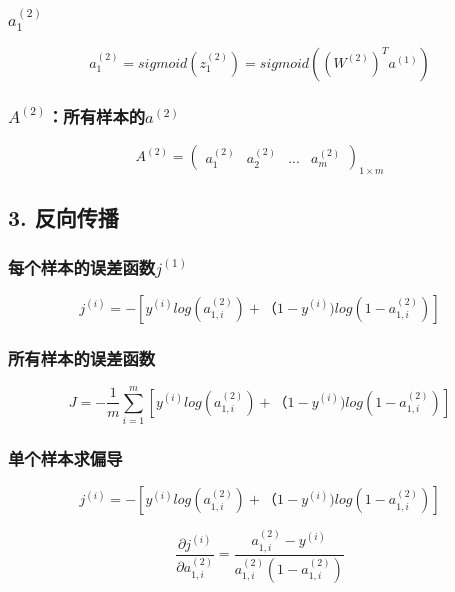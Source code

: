 \documentclass[
]{article}
\begin{document}
\hypertarget{header-n42}{%
\subsubsection{\texorpdfstring{\(a^{(2)}_{1}\)}{a\^{}\{(2)\}\_\{1\}}}\label{header-n42}}

\[a^{(2)}_{1} = sigmoid(z^{(2)}_{1}) = sigmoid((W^{(2)})^{T}a^{(1)})\]

\hypertarget{header-n44}{%
\subsubsection{\texorpdfstring{\(A^{(2)}\)：所有样本的\(a^{(2)}\)}{A\^{}\{(2)\}：所有样本的a\^{}\{(2)\}}}\label{header-n44}}

\[A^{(2)} = {\begin{pmatrix}
  a^{(2)}_{1} & a^{(2)}_{2} & ... & a^{(2)}_{m}
\end{pmatrix}}_{1×m}\]

\hypertarget{header-n46}{%
\subsection{3. 反向传播}\label{header-n46}}

\hypertarget{header-n47}{%
\subsubsection{\texorpdfstring{每个样本的误差函数\(j^{(1)}\)}{每个样本的误差函数j\^{}\{(1)\}}}\label{header-n47}}

\[j^{(i)} = -[y^{(i)}log(a^{(2)}_{1,i})+（1-y^{(i)})log(1-a^{(2)}_{1,i})]\]

\hypertarget{header-n49}{%
\subsubsection{所有样本的误差函数}\label{header-n49}}

\[J = -\frac{1}{m}\sum_{i=1}^{m}[y^{(i)}log(a^{(2)}_{1,i})+（1-y^{(i)})log(1-a^{(2)}_{1,i})]\]

\hypertarget{header-n51}{%
\subsubsection{单个样本求偏导}\label{header-n51}}

\[j^{(i)} = -[y^{(i)}log(a^{(2)}_{1,i})+（1-y^{(i)})log(1-a^{(2)}_{1,i})]\]

\[\frac{\partial{j^{(i)}}}{\partial{a^{(2)}_{1,i}}} = \frac{a^{(2)}_{1,i}-y^{(i)}}{a^{(2)}_{1,i}(1-a^{(2)}_{1,i})}\]
\end{document}
